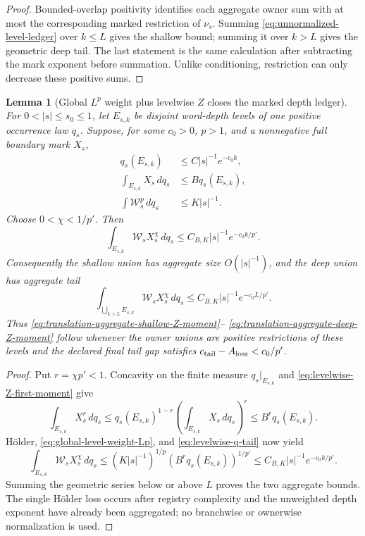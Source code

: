 \documentclass[11pt]{article}
\newtheorem{lemma}[theorem]{Lemma}
\begin{document}
\begin{proof}
Bounded-overlap positivity identifies each aggregate owner sum with at most
the corresponding marked restriction of $\nu_s$.  Summing
\eqref{eq:unnormalized-level-ledger} over $k\le L$ gives the shallow bound;
summing it over $k>L$ gives the geometric deep tail.  The last statement is
the same calculation after subtracting the mark exponent before summation.
Unlike conditioning, restriction can only decrease these positive sums.
\end{proof}

\begin{lemma}[Global $L^p$ weight plus levelwise $Z$ closes the marked
depth ledger]
\label{lem:global-Lp-levelwise-Z}
For $0<|s|\le s_0\le1$, let $E_{s,k}$ be disjoint word-depth levels of one
positive occurrence law $q_s$.  Suppose, for some $c_0>0$, $p>1$, and a
nonnegative full boundary mark $X_s$,
\begin{align}
 q_s(E_{s,k})&\le C|s|^{-1}e^{-c_0k},
 \label{eq:levelwise-q-tail}\\
 \int_{E_{s,k}}X_s\,dq_s&\le Bq_s(E_{s,k}),
 \label{eq:levelwise-Z-first-moment}\\
 \int \mathcal W_s^p\,dq_s&\le K|s|^{-1}.
 \label{eq:global-level-weight-Lp}
\end{align}
Choose $0<\chi<1/p'$.  Then
\begin{equation}
\label{eq:derived-marked-level-ledger}
 \int_{E_{s,k}}\mathcal W_sX_s^\chi\,dq_s
 \le C_{B,K}|s|^{-1}e^{-c_0k/p'}.
\end{equation}
Consequently the shallow union has aggregate size $O(|s|^{-1})$, and the
deep union has aggregate tail
\begin{equation}
\label{eq:derived-marked-deep-tail}
 \int_{\bigcup_{k>L}E_{s,k}}
 \mathcal W_sX_s^\chi\,dq_s
 \le C_{B,K}|s|^{-1}e^{-c_0L/p'}.
\end{equation}
Thus \eqref{eq:translation-aggregate-shallow-Z-moment}--
\eqref{eq:translation-aggregate-deep-Z-moment} follow whenever the owner
unions are positive restrictions of these levels and the declared final
tail gap satisfies
$c_{\rm tail}-A_{\rm loss}<c_0/p'$.
\end{lemma}

\begin{proof}
Put $r=\chi p'<1$.  Concavity on the finite measure
$q_s|_{E_{s,k}}$ and \eqref{eq:levelwise-Z-first-moment} give
\[
 \int_{E_{s,k}}X_s^r\,dq_s
 \le q_s(E_{s,k})^{1-r}
      \left(\int_{E_{s,k}}X_s\,dq_s\right)^r
 \le B^r q_s(E_{s,k}).
\]
H\"older, \eqref{eq:global-level-weight-Lp}, and
\eqref{eq:levelwise-q-tail} now yield
\[
 \int_{E_{s,k}}\mathcal W_sX_s^\chi\,dq_s
 \le (K|s|^{-1})^{1/p}
      (B^rq_s(E_{s,k}))^{1/p'}
 \le C_{B,K}|s|^{-1}e^{-c_0k/p'}.
\]
Summing the geometric series below or above $L$ proves the two aggregate
bounds.  The single H\"older loss occurs after registry complexity and the
unweighted depth exponent have already been aggregated; no branchwise or
ownerwise normalization is used.
\end{proof}
\end{document}
